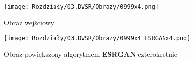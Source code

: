 \begin{figure}[ht]
    \centering
    \begin{minipage}[t]{0.45\linewidth}
        \texttt{[image: Rozdziały/03.DWSR/Obrazy/0999x4.png]}
        \caption{Obraz wejściowy}
        \label{fig:image71}
    \end{minipage}
    \hspace{0.5cm}
    \begin{minipage}[t]{0.45\linewidth}
        \texttt{[image: Rozdziały/03.DWSR/Obrazy/0999x4\_ESRGANx4.png]}
        \caption{Obraz powiększony algorytmem \textbf{ESRGAN} czterokrotnie}
        \label{fig:image72}
    \end{minipage}
\end{figure}